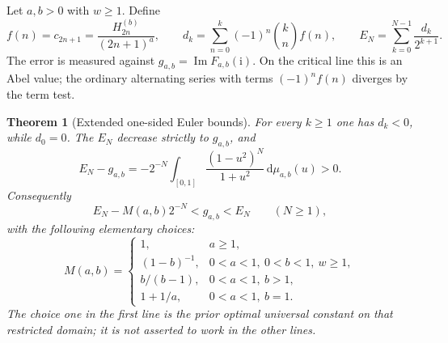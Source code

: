 \documentclass[11pt]{article}
\numberwithin{equation}{section}
\newtheorem{theorem}{Theorem}[section]
\theoremstyle{definition}\newtheorem{definition}[theorem]{Definition}
\theoremstyle{remark}\newtheorem{remark}[theorem]{Remark}
\newcommand{\dd}{\,\mathrm d}
\newcommand{\ii}{\mathrm i}
\DeclareMathOperator{\Impart}{Im}
\begin{document}
Let $a,b>0$ with $w\ge1$. Define
\begin{equation}\label{eq:eulerdef}
 f(n)=c_{2n+1}=\frac{H_{2n}^{(b)}}{(2n+1)^a},\qquad
 d_k=\sum_{n=0}^k(-1)^n\binom kn f(n),\qquad
 E_N=\sum_{k=0}^{N-1}\frac{d_k}{2^{k+1}}.
\end{equation}
The error is measured against $g_{a,b}=\Impart F_{a,b}(\ii)$.
On the critical line this is an Abel value; the ordinary alternating
series with terms $(-1)^nf(n)$ diverges by the term test.

\begin{theorem}[Extended one-sided Euler bounds]\label{thm:euler}
For every $k\ge1$ one has $d_k<0$, while $d_0=0$. The $E_N$ decrease
strictly to $g_{a,b}$, and
\begin{equation}\label{eq:exacteuler}
 E_N-g_{a,b}=-2^{-N}\int_{[0,1]}
       \frac{(1-u^2)^N}{1+u^2}\dd\mu_{a,b}(u)>0.
\end{equation}
Consequently
\begin{equation}\label{eq:eulerenclosure}
 E_N-M(a,b)2^{-N}<g_{a,b}<E_N\qquad(N\ge1),
\end{equation}
with the following elementary choices:
\begin{equation}\label{eq:Mchoices}
 M(a,b)=
 \begin{cases}
 1,&a\ge1,\\
 (1-b)^{-1},&0<a<1,\ 0<b<1,\ w\ge1,\\
 b/(b-1),&0<a<1,\ b>1,\\
 1+1/a,&0<a<1,\ b=1.
 \end{cases}
\end{equation}
The choice one in the first line is the prior optimal universal
constant on that restricted domain; it is not asserted to work in
the other lines.
\end{theorem}
\end{document}
